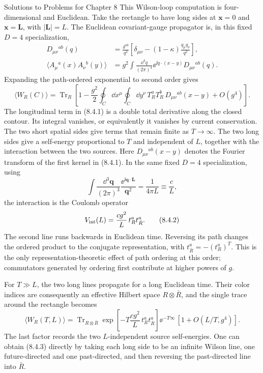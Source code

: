 \begin{bankssolutions}{Solutions to Problems for Chapter 8}
This Wilson-loop computation is four-dimensional and Euclidean.
Take the rectangle to have long sides at $\mathbf x=0$ and
$\mathbf x=\mathbf L$, with $|\mathbf L|=L$.  The Euclidean covariant-gauge
propagator is, in this fixed $D=4$ specialization,
\begin{equation}
\begin{aligned}
  D_{\mu\nu}{}^{ab}(q)
  &=\frac{\delta^{ab}}{q^2}
  \left[\delta_{\mu\nu}-(1-\kappa)\frac{q_\mu q_\nu}{q^2}\right],\\
  \langle A_\mu{}^a(x)A_\nu{}^b(y)\rangle
  &=g^2\int\frac{\dd^4q}{(2\pi)^4}
  \ee^{\ii q\cdot(x-y)}D_{\mu\nu}{}^{ab}(q).
\end{aligned}
\tag{8.4.1}
\end{equation}
Expanding the path-ordered exponential to second order gives
\[
  \langle W_R(C)\rangle
  =\operatorname{Tr}_R\left[1-
  \frac{g^2}{2}\oint_C\dd x^\mu\oint_C\dd y^\nu\,
  T_R^aT_R^b\,D_{\mu\nu}{}^{ab}(x-y)+O(g^4)\right].
\]
The longitudinal term in (8.4.1) is a double total derivative along the
closed contour.  Its integral vanishes, or equivalently it vanishes by current
conservation.  The two short spatial sides give terms that remain finite as
$T\to\infty$.  The two long sides give a self-energy proportional to $T$ and
independent of $L$, together with the interaction between the two sources.
Here $D_{\mu\nu}{}^{ab}(x-y)$ denotes the Fourier transform of the first kernel
in (8.4.1).
In the same fixed $D=4$ specialization, using
\[
  \int\frac{\dd^3\mathbf q}{(2\pi)^3}
  \frac{\ee^{\ii\mathbf q\cdot\mathbf L}}{\mathbf q^2}
  =\frac{1}{4\pi L}\equiv\frac{c}{L},
\]
the interaction is the Coulomb operator
\[
  V_{\rm int}(L)=\frac{cg^2}{L}\,t_R^a t_{\bar R}^a .
  \tag{8.4.2}
\]
The second line runs backwards in Euclidean time.  Reversing its path changes
the ordered product to the conjugate representation, with
$t_{\bar R}^a=-(t_R^a)^T$.  This is the only representation-theoretic effect of
path ordering at this order; commutators generated by ordering first contribute
at higher powers of $g$.

For $T\gg L$, the two long lines propagate for a long Euclidean time.  Their
color indices are consequently an effective Hilbert space
$R\otimes\bar R$, and the single trace around the rectangle becomes
\[
  \langle W_R(T,L)\rangle
  =\operatorname{Tr}_{R\otimes\bar R}
  \exp\!\left[-T\frac{cg^2}{L}\,t_R^at_{\bar R}^a\right]
  \ee^{-T\infty}\,[1+O(L/T,g^4)].
  \tag{8.4.3}
\]
The last factor records the two $L$-independent source self-energies.  One can
obtain (8.4.3) directly by taking each long side to be an infinite Wilson
line, one future-directed and one past-directed, and then reversing the
past-directed line into $\bar R$.


\end{bankssolutions}
